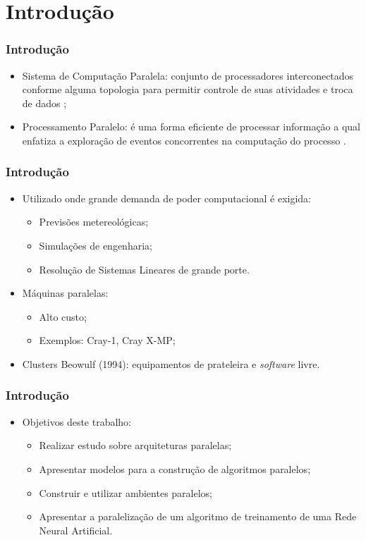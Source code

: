 \section{Introdu\c{c}\~ao}
	\begin{frame}
	\frametitle{Introdu\c{c}\~ao}
		\begin{itemize}
			\item Sistema de Computa\c{c}\~ao Paralela: conjunto de processadores interconectados conforme alguma topologia para permitir controle de suas atividades e troca de dados \cite{CACERES2001};
			\item Processamento Paralelo: \'e uma forma eficiente de processar informa\c{c}\~ao a qual enfatiza a explora\c{c}\~ao de eventos concorrentes na computa\c{c}\~ao do processo \cite{DIVERIO2002}.
		\end{itemize}
	\end{frame}

	\begin{frame}
	\frametitle{Introdu\c{c}\~ao}
		\begin{itemize}
			\item Utilizado onde grande demanda de poder computacional \'e exigida:
				\begin{itemize}
					\item Previs\~oes metereol\'ogicas;
					\item Simula\c{c}\~oes de engenharia;
					\item Resolu\c{c}\~ao de Sistemas Lineares de grande porte.
				\end{itemize}
			\item M\'aquinas paralelas:
			\begin{itemize}
				\item Alto custo; 
			 	\item Exemplos: Cray-1, Cray X-MP;
			\end{itemize}

			\item Clusters Beowulf (1994): equipamentos de prateleira e {\it software} livre.
		\end{itemize}
	\end{frame}

	\begin{frame}
	\frametitle{Introdu\c{c}\~ao}
		\begin{itemize}
			\item Objetivos deste trabalho:
				\begin{itemize}
					\item Realizar estudo sobre arquiteturas paralelas;
					\item Apresentar modelos para a constru\c{c}\~ao de algoritmos paralelos;
					\item Construir e utilizar ambientes paralelos;
					\item Apresentar a paraleliza\c{c}\~ao de um algoritmo de treinamento de uma Rede Neural Artificial.
				\end{itemize}
		\end{itemize}
	\end{frame}

